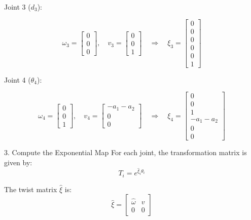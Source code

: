 \documentclass[12pt]{report}
\begin{document}
Joint 3 (\(d_3\)):

\begin{equation}
	\omega_3 = \begin{bmatrix} 0 \\ 0 \\ 0 \end{bmatrix}, \quad
	v_3 = \begin{bmatrix} 0 \\ 0 \\ 1 \end{bmatrix} \quad
	\Rightarrow \quad
	\xi_3 =
	\begin{bmatrix}
		0 \\ 0 \\ 0 \\ 0 \\ 0 \\ 1
	\end{bmatrix}
\end{equation}


Joint 4 (\(\theta_4\)):

\begin{equation}
	\omega_4 = \begin{bmatrix} 0 \\ 0 \\ 1 \end{bmatrix}, \quad
	v_4 = \begin{bmatrix} -a_1 - a_2 \\ 0 \\ 0 \end{bmatrix} \quad
	\Rightarrow \quad
	\xi_4 =
	\begin{bmatrix}
		0 \\ 0 \\ 1 \\ -a_1 - a_2 \\ 0 \\ 0
	\end{bmatrix}
\end{equation}


3. Compute the Exponential Map
For each joint, the transformation matrix is given by:
\begin{equation}
	T_i = e^{\hat{\xi}_i \theta_i}
\end{equation}


The twist matrix \(\hat{\xi}\) is:
\begin{equation}
	\hat{\xi} =
	\begin{bmatrix}
		\hat{\omega} & v \\
		0 & 0
	\end{bmatrix}
\end{equation}
\end{document}
